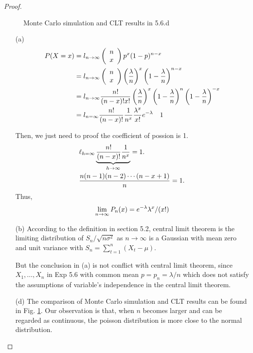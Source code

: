 \begin{proof}
\begin{figure}[tbh!]
		\centering
		\caption{Monte Carlo simulation and CLT results in 5.6.d}
		\label{pics56}
		\end{figure}
\begin{enumerate}
	\item[(a)] 
		\begin{equation}
		\begin{aligned}
		\notag
		P(X=x) &=l_{n \rightarrow \infty}\left(\begin{array}{l}
		n \\
		x
		\end{array}\right) p^{x}(1-p)^{n-x}  \\
		&=l_{n \rightarrow \infty}\left(\begin{array}{l}
		n \\
		x
		\end{array}\right)\left(\frac{\lambda}{n}\right)^{x}\left(1-\frac{\lambda}{n}\right)^{n-x}  \\
		&=l_{n \rightarrow \infty} \frac{n !}{(n-x) ! x !}\left(\frac{\lambda}{n}\right)^{x}\left(1-\frac{\lambda}{n}\right)^{n}\left(1-\frac{\lambda}{n}\right)^{-x} \\
		&=l_{n=\infty} \frac{n !}{(n-x) !} \frac{1}{n^{x}} \frac{\lambda^{x}}{x !} e^{-\lambda} \quad 1
		\end{aligned}
		\end{equation}
		
		Then, we just need to proof the coefficient of possion is 1.
		\begin{equation}
		\begin{aligned}
		\notag
		&\ell_{h=\infty} \underbrace{\frac{n !}{(n-x) !} \frac{1}{n^{x}}}_{h \rightarrow \infty}=1 . \\
		&\frac{n(n-1)(n-2) \cdots(n-x+1)}{n}=1 .
		\end{aligned}
		\end{equation}
		Thus, 
		\begin{equation} 
		\notag
		\lim _{n \rightarrow \infty} P_{n}(x)=e^{-\lambda} \lambda^{x} /(x !)
		\end{equation}
	\item [(b)]
		According to the definition in section 5.2, central limit theorem is the limiting distribution of $S_{n} / \sqrt{n \sigma^{2}}$ as $n \rightarrow \infty$ is a Gaussian with mean zero and unit variance with $S_{n}=\sum_{t=1}^{n}\left(X_{t}-\mu \right)$. 
		
		But  the conclusion in (a) is not conflict with central limit theorem, since $X_1, \ldots, X_n$ in Exp 5.6 with common mean $p=p_{n}=\lambda / n$ which does not satisfy the assumptions of variable's independence in the central limit theorem.
	\item [(d)] The comparison of Monte Carlo simulation and CLT results can be found in Fig. \ref{pics56}.
		Our observation is that, when $n$ becomes larger and can be regarded as continuous, the poisson distribution is more close to the normal distribution.
\end {enumerate}
\end{proof}






